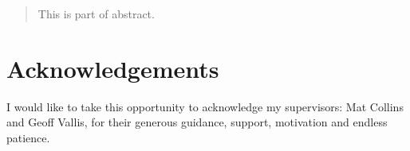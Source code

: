 
\maketitle

\begin{abstract}
This is part of abstract.
\end{abstract}

\makedeclaration

\newpage
\chapter*{Acknowledgements}
I would like to take this opportunity to acknowledge my supervisors: Mat Collins and Geoff Vallis, for their generous guidance, support, motivation and endless patience. 


\newpage
\pagestyle{fancy}
\setcounter{tocdepth}{4}
\tableofcontents

\newpage
{}
\listoftables

\newpage
{}
\listoffigures


